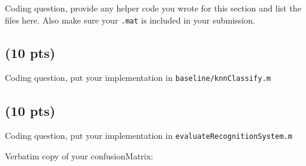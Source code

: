 \documentclass[12pt]{article}
\newcounter{list}
\begin{document}
Coding question, provide any helper code you wrote for this section and list the files here. Also make sure your
\verb+.mat+ is included in your submission.



\subsection{(10 pts)}

Coding question, put your implementation in \verb+baseline/knnClassify.m+



\subsection{(10 pts)}
\label{confusionMatrix}

Coding question, put your implementation in \verb+evaluateRecognitionSystem.m+



Verbatim copy of your confusionMatrix:
\end{document}
